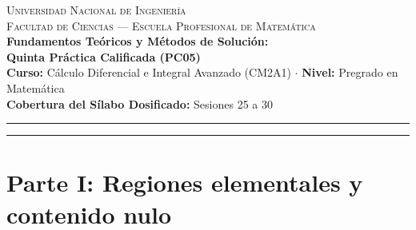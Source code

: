 \documentclass[11pt,a4paper]{article}
\begin{document}
\begin{center}
    {\large \scshape Universidad Nacional de Ingeniería}\\[0.15cm]
    {\large \scshape Facultad de Ciencias --- Escuela Profesional de Matemática}\\[0.35cm]
    {\LARGE \bfseries \color{navyblue} Fundamentos Teóricos y Métodos de Solución:\\Quinta Práctica Calificada (PC05)}\\[0.25cm]
    {\large \textbf{Curso:} Cálculo Diferencial e Integral Avanzado (CM2A1) \quad $\cdot$ \quad \textbf{Nivel:} Pregrado en Matemática}\\[0.2cm]
    {\small \textbf{Cobertura del Sílabo Dosificado:} Sesiones 25 a 30}
\end{center}
\vspace{-0.2cm}
\hrule height 1.2pt
\vspace{0.4cm}

\begin{abstract}
Este compendio proporciona el marco teórico riguroso, analítico y didáctico necesario para dominar con solidez los fundamentos evaluados en la \textbf{Quinta Práctica Calificada (PC05)} del curso CM2A1 de la Escuela Profesional de Matemática de la Universidad Nacional de Ingeniería. Abarca desde la teoría de integrales dobles y triples sobre regiones elementales y conjuntos de contenido nulo, el poderoso Teorema de Fubini para el cálculo de volúmenes e integrales iteradas, hasta los sistemas de coordenadas polares, cilíndricas y esféricas. Incluye el análisis exhaustivo del Teorema de Cambio de Variable y generalizaciones a $\mathbb{R}^n$. Cada sección integra definiciones formales con nivel de rigor matemático puro, ejemplos mínimos transparentes, ejercicios tipo examen de semestres recientes (2024-II, 2025-I) resueltos minuciosamente paso a paso sin omitir detalles algebraicos ni topológicos, y una sección crítica sobre errores comunes y trampas conceptuales típicas en evaluaciones UNI.
\end{abstract}

\tableofcontents
\vspace{0.5cm}
\hrule
\vspace{0.6cm}

\part*{Parte I: Regiones elementales y contenido nulo}
\end{document}
